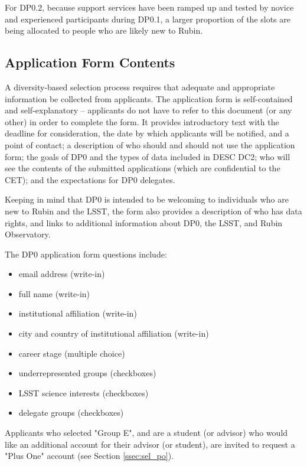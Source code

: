 \documentclass[DM,lsstdraft,authoryear,toc]{lsstdoc}
\begin{document}
For DP0.2, because support services have been ramped up and tested by novice and experienced participants during DP0.1, a larger proportion of the slots are being allocated to people who are likely new to Rubin. 


\subsection{Application Form Contents}\label{ssec:sel_form}

A diversity-based selection process requires that adequate and appropriate information be collected from applicants.
The application form is self-contained and self-explanatory -- applicants do not have to refer to this document (or any other) in order to complete the form.
It provides introductory text with the deadline for consideration, the date by which applicants will be notified, and a point of contact; a description of who should and should not use the application form; the goals of DP0 and the types of data included in DESC DC2; who will see the contents of the submitted applications (which are confidential to the CET); and the expectations for DP0 delegates.

Keeping in mind that DP0 is intended to be welcoming to individuals who are new to Rubin and the LSST, the form also provides a description of who has data rights, and links to additional information about DP0, the LSST, and Rubin Observatory.

The DP0 application form questions include:
\begin{itemize}
\item email address (write-in)
\item full name (write-in)
\item institutional affiliation (write-in)
\item city and country of institutional affiliation (write-in)
\item career stage (multiple choice)
\item underrepresented groups (checkboxes)
\item LSST science interests (checkboxes)
\item delegate groups (checkboxes)
\end{itemize}

Applicants who selected "Group E", and are a student (or advisor) who would like an additional account for their advisor (or student), are invited to request a "Plus One" account (see Section \ref{ssec:sel_po}).
\end{document}

